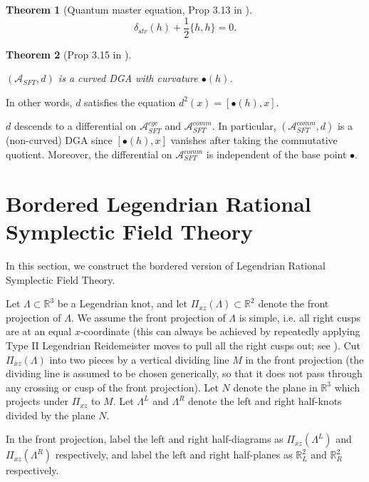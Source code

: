 \documentclass[a4paper,final, reqno]{amsart}
\theoremstyle{plain}
\newtheorem{Th}{Theorem}[section]
\theoremstyle{definition}
\newcommand{\A}{\mathcal{A}}
\begin{document}
	
	\begin{Th}[Quantum master equation, Prop 3.13 in \cite{ng}]\label{thm:quantum}
		\[ \delta_{str}(h) + \frac{1}{2} \{h,h\} = 0.\]
	\end{Th}
	
	
	\begin{Th} [Prop 3.15 in \cite{ng}]
		
		\-\
		
		$(\A_{SFT}, d)$ is a curved DGA with curvature $\bullet(h)$. 
	\end{Th}
	
	In other words, $d$ satisfies the equation $d^2(x) = [\bullet(h), x]$.
	
	
	$d$ descends to a differential on $\A_{SFT}^{cyc}$ and $\A_{SFT}^{comm}$. In particular, $(\A_{SFT}^{comm}, d)$ is a (non-curved) DGA since $[\bullet(h),x]$ vanishes after taking the commutative quotient. Moreover, the differential on $\A_{SFT}^{comm}$ is independent of the base point $\bullet$.
	
	
	
	
	\section{Bordered Legendrian Rational Symplectic Field Theory}\label{sec:blsft}
	
	
	
	
	
	
	In this section, we construct the bordered version of Legendrian Rational Symplectic Field Theory. 
	
	Let $\Lambda \subset \mathbb{R}^3$ be a Legendrian knot, and let $\Pi_{xz}(\Lambda) \subset \mathbb{R}^2$ denote the front projection of $\Lambda$. We assume the front projection of $\Lambda$ is simple, i.e. all right cusps are at an equal $x$-coordinate (this can always be achieved by repeatedly applying Type II Legendrian Reidemeister moves to pull all the right cusps out; see ). Cut $\Pi_{xz}(\Lambda)$ into two pieces by a vertical dividing line $M$ in the front projection (the dividing line is assumed to be chosen generically, so that it does not pass through any crossing or cusp of the front projection). Let $N$ denote the plane in $\mathbb{R}^3$ which projects under $\Pi_{xz}$ to $M$. Let $\Lambda^L$ and $\Lambda^R$ denote the left and right half-knots divided by the plane $N$. 
	
	In the front projection, label the left and right half-diagrams as $\Pi_{xz}(\Lambda^L)$ and $\Pi_{xz}(\Lambda^R)$ respectively, and label the left and right half-planes as $\mathbb{R}^2_L$ and $\mathbb{R}^2_R$ respectively. %
	
\end{document}
